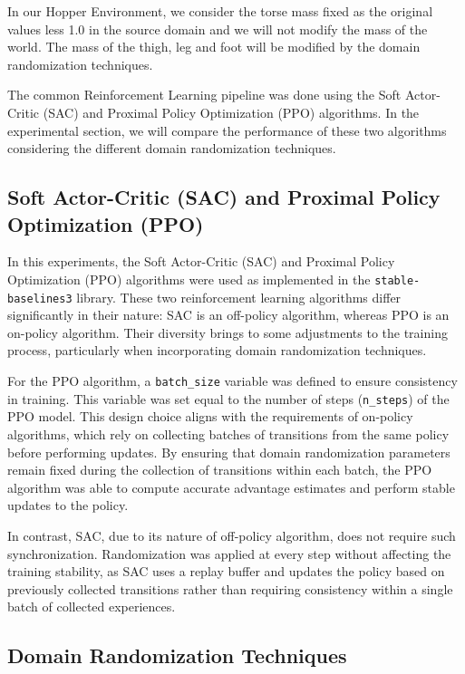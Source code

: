 \documentclass[11pt]{article}
\begin{document}
In our Hopper Environment, we consider the torse mass fixed as the original values less 1.0 in the source domain and we will not modify the mass of the world. The mass of the thigh, leg and foot will be modified by the domain randomization techniques.

The common Reinforcement Learning pipeline was done using the Soft Actor-Critic (SAC) and Proximal Policy Optimization (PPO) algorithms. In the experimental section, we will compare the performance of these two algorithms considering the different domain randomization techniques.


\subsection{Soft Actor-Critic (SAC) and Proximal Policy Optimization (PPO)}

In this experiments, the Soft Actor-Critic (SAC) and Proximal Policy Optimization (PPO) algorithms were used as implemented in the \texttt{stable-baselines3} library. These two reinforcement learning algorithms differ significantly in their nature: SAC is an off-policy algorithm, whereas PPO is an on-policy algorithm. Their diversity brings to some adjustments to the training process, particularly when incorporating domain randomization techniques.

For the PPO algorithm, a \texttt{batch\_size} variable was defined to ensure consistency in training. This variable was set equal to the number of steps (\texttt{n\_steps}) of the PPO model. This design choice aligns with the requirements of on-policy algorithms, which rely on collecting batches of transitions from the same policy before performing updates. By ensuring that domain randomization parameters remain fixed during the collection of transitions within each batch, the PPO algorithm was able to compute accurate advantage estimates and perform stable updates to the policy.

In contrast, SAC, due to its nature of off-policy algorithm, does not require such synchronization. Randomization was applied at every step without affecting the training stability, as SAC uses a replay buffer and updates the policy based on previously collected transitions rather than requiring consistency within a single batch of collected experiences.

\subsection{Domain Randomization Techniques}
\end{document}
